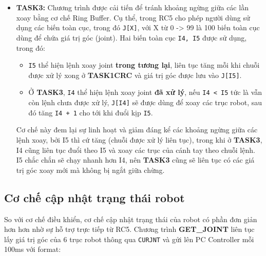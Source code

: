 \begin{itemize}
    Chuỗi dữ liệu hợp lệ (pass được khối CRC\_check) sẽ tiến tới phần bóc tách dữ liệu góc joint\_seperation, qua đó từng giá trị số nguyên sẽ được lấy ra, convert sang giá trị số và chia 100 để lấy giá trị số thực của góc xoay. Sáu giá trị góc sau đó lưu vào biến toàn cục \lstinline[style=inlinecode]{J[I5]}. \lstinline[style=inlinecode]{I5 + 1} và \lstinline[style=inlinecode]{I1 = 0} để cho phép \textbf{TASK0} đọc vào chuỗi UART tiếp theo.
    \item \textbf{TASK3:} Chương trình được cải tiến để tránh khoảng ngừng giữa các lần xoay bằng cơ chế Ring Buffer. Cụ thể, trong RC5 cho phép người dùng sử dụng các biến toàn cục, trong đó \lstinline[style=inlinecode]{J[X]}, với X từ 0 -> 99 là 100 biến toàn cục dùng để chứa giá trị góc (joint). Hai biến toàn cục \lstinline[style=inlinecode]{I4, I5} được sử dụng, trong đó:
    \begin{itemize}
        \item \lstinline[style=inlinecode]{I5} thể hiện lệnh xoay joint \textbf{trong tương lại}, liên tục tăng mỗi khi chuỗi được xử lý xong ở \textbf{TASK1CRC} và giá trị góc được lưu vào \lstinline[style=inlinecode]{J[I5]}.
        \item Ở \textbf{TASK3}, \lstinline[style=inlinecode]{I4} thể hiện lệnh xoay joint \textbf{đã xử lý}, nếu \lstinline[style=inlinecode]{I4 < I5} tức là vẫn còn lệnh chưa được xử lý, \lstinline[style=inlinecode]{J[I4]} sẽ được dùng để xoay các trục robot, sau đó tăng \lstinline[style=inlinecode]{I4 + 1} cho tới khi đuổi kịp \lstinline[style=inlinecode]{I5}.
    \end{itemize}
    Cơ chế này đem lại sự linh hoạt và giảm đáng kể các khoảng ngừng giữa các lệnh xoay, bởi I5 thì cứ tăng (chuỗi được xử lý liên tục), trong khi ở \textbf{TASK3}, I4 cũng liên tục đuổi theo I5 và xoay các trục của cánh tay theo chuỗi lệnh. I5 chắc chắn sẽ chạy nhanh hơn I4, nên \textbf{TASK3} cũng sẽ liên tục có các giá trị góc xoay mới mà không bị ngắt giữa chừng.
\end{itemize}

\subsection{Cơ chế cập nhật trạng thái robot}

So với cơ chế điều khiển, cơ chế cập nhật trạng thái của robot có phần đơn giản hơn hơn nhờ sự hỗ trợ trực tiếp từ RC5. Chương trình \textbf{GET\_JOINT} liên tục lấy giá trị góc của 6 trục robot thông qua \lstinline[style=inlinecode]{CURJNT} và gửi lên PC Controller mỗi 100ms với format:

